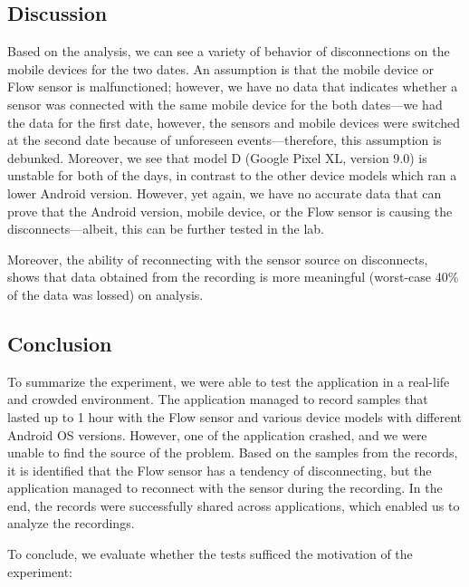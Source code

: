 \subsection{Discussion}

Based on the analysis, we can see a variety of behavior of disconnections on the mobile devices for the two dates. An assumption is that the mobile device or Flow sensor is malfunctioned; however, we have no data that indicates whether a sensor was connected with the same mobile device for the both dates---we had the data for the first date, however, the sensors and mobile devices were switched at the second date because of unforeseen events---therefore, this assumption is debunked. Moreover, we see that model D (Google Pixel XL, version 9.0) is unstable for both of the days, in contrast to the other device models which ran a lower Android version. However, yet again, we have no accurate data that can prove that the Android version, mobile device, or the Flow sensor is causing the disconnects---albeit, this can be further tested in the lab. 

Moreover, the ability of reconnecting with the sensor source on disconnects, shows that data obtained from the recording is more meaningful (worst-case 40\% of the data was lossed) on analysis.


\subsection{Conclusion}
To summarize the experiment, we were able to test the application in a real-life and crowded environment. The application managed to record samples that lasted up to 1 hour with the Flow sensor and various device models with different Android OS versions. However, one of the application crashed, and we were unable to find the source of the problem. Based on the samples from the records, it is identified that the Flow sensor has a tendency of disconnecting, but the application managed to reconnect with the sensor during the recording. In the end, the records were successfully shared across applications, which enabled us to analyze the recordings.  

To conclude, we evaluate whether the tests sufficed the motivation of the experiment:

